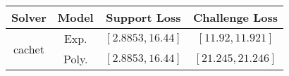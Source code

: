 \begin{tabular}{cc|c|c} 
\hline 
 Solver & Model & Support Loss  & Challenge Loss \tabularnewline\hline 
\hline 
\multirow{2}{*}{cachet} & Exp. & $\mathbf{\left[2.8853,16.44\right]}$ & $\mathbf{\left[11.92,11.921\right]}$ \tabularnewline 
 & Poly. & $\left[2.8853,16.44\right]$ & $\left[21.245,21.246\right]$ \tabularnewline 
\hline 
\end{tabular} 

